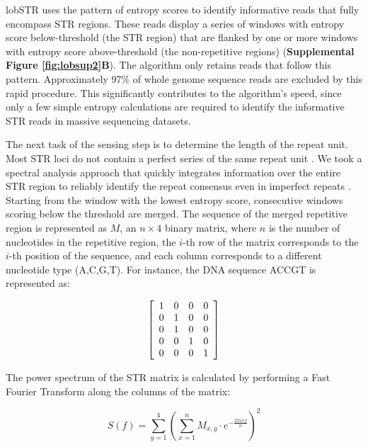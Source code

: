 {lobSTR uses the pattern of entropy scores to identify informative reads that fully encompass STR regions. These reads display a series of windows with entropy score below-threshold (the STR region) that are flanked by one or more windows with entropy score above-threshold (the non-repetitive regions) (\textbf{Supplemental Figure \ref{fig:lobsup2}B}). The algorithm only retains reads that follow this pattern. Approximately 97\% of whole genome sequence reads are excluded by this rapid procedure. This significantly contributes to the algorithm's speed, since only a few simple entropy calculations are required to identify the informative STR reads in massive sequencing datasets.

The next task of the sensing step is to determine the length of the repeat unit. Most STR loci do not contain a perfect series of the same repeat unit \cite{Benson1999}. We took a spectral analysis approach that quickly integrates information over the entire STR region to reliably identify the repeat consensus even in imperfect repeats \cite{SharmaIssacRaghavaEtAl2004}. Starting from the window with the lowest entropy score, consecutive windows scoring below the threshold are merged. The sequence of the merged repetitive region is represented as $M$, an $n \times 4$ binary matrix, where $n$ is the number of nucleotides in the repetitive region, the $i$-th row of the matrix corresponds to the $i$-th position of the sequence, and each column corresponds to a different nucleotide type (A,C,G,T). For instance, the DNA sequence ACCGT is represented as:

\begin{equation}
\left[
\begin{array}{c c c c}
1 & 0 & 0 & 0 \\
0 & 1 & 0 & 0 \\
0 & 1 & 0 & 0 \\
0 & 0 & 1 & 0 \\
0 & 0 & 0 & 1 \\
\end{array}
\right]
\end{equation}

The power spectrum of the STR matrix is calculated by performing a Fast Fourier Transform along the columns of the matrix:

\begin{equation}
S(f) = \sum_{y=1}^4 \left( \sum_{x=1}^n M_{x,y} \cdot e^{-\frac{2\pi ixf}{n}} \right) ^2
\end{equation}

}
